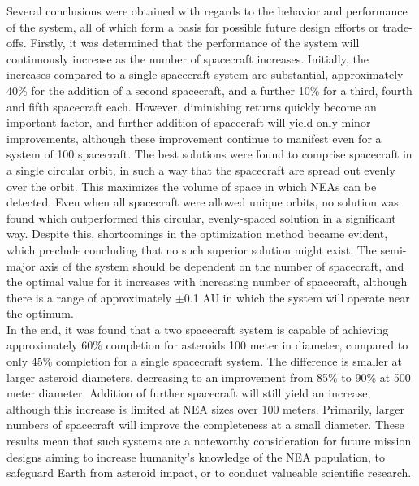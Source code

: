 Several conclusions were obtained with regards to the behavior and performance of the system, all of which form a basis for possible future design efforts or trade-offs. Firstly, it was determined that the performance of the system will continuously increase as the number of spacecraft increases. Initially, the increases compared to a single-spacecraft system are substantial, approximately 40\% for the addition of a second spacecraft, and a further 10\% for a third, fourth and fifth spacecraft each. However, diminishing returns quickly become an important factor, and further addition of spacecraft will yield only minor improvements, although these improvement continue to manifest even for a system of 100 spacecraft. The best solutions were found to comprise spacecraft in a single circular orbit, in such a way that the spacecraft are spread out evenly over the orbit. This maximizes the volume of space in which NEAs can be detected. Even when all spacecraft were allowed unique orbits, no solution was found which outperformed this circular, evenly-spaced solution in a significant way. Despite this, shortcomings in the optimization method became evident, which preclude concluding that no such superior solution might exist. The semi-major axis of the system should be dependent on the number of spacecraft, and the optimal value for it increases with increasing number of spacecraft, although there is a range of approximately $\pm$0.1 AU in which the system will operate near the optimum. \\

In the end, it was found that a two spacecraft system is capable of achieving approximately 60\% completion for asteroids 100 meter in diameter, compared to only 45\% completion for a single spacecraft system. The difference is smaller at larger asteroid diameters, decreasing to an improvement from 85\% to 90\% at 500 meter diameter. Addition of further spacecraft will still yield an increase, although this increase is limited at NEA sizes over 100 meters. Primarily, larger numbers of spacecraft will improve the completeness at a small diameter. These results mean that such systems are a noteworthy consideration for future mission designs aiming to increase humanity's knowledge of the NEA population, to safeguard Earth from asteroid impact, or to conduct valueable scientific research.
